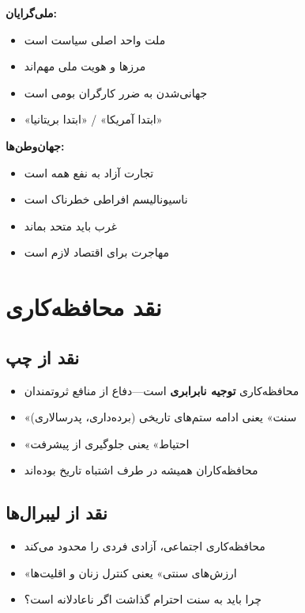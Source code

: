 \begin{debatebox}
\textbf{ملی‌گرایان:}
\begin{itemize}[nosep]
    \item ملت واحد اصلی سیاست است
    \item مرزها و هویت ملی مهم‌اند
    \item جهانی‌شدن به ضرر کارگران بومی است
    \item «ابتدا آمریکا» / «ابتدا بریتانیا»
\end{itemize}

\textbf{جهان‌وطن‌ها:}
\begin{itemize}[nosep]
    \item تجارت آزاد به نفع همه است
    \item ناسیونالیسم افراطی خطرناک است
    \item غرب باید متحد بماند
    \item مهاجرت برای اقتصاد لازم است
\end{itemize}
\end{debatebox}

\section{نقد محافظه‌کاری}

\subsection{نقد از چپ}

\begin{itemize}[nosep, rightmargin=1.5cm]
    \item محافظه‌کاری \textbf{توجیه نابرابری} است—دفاع از منافع ثروتمندان
    \item «سنت» یعنی ادامه ستم‌های تاریخی (برده‌داری، پدرسالاری)
    \item «احتیاط» یعنی جلوگیری از پیشرفت
    \item محافظه‌کاران همیشه در طرف اشتباه تاریخ بوده‌اند
\end{itemize}

\subsection{نقد از لیبرال‌ها}

\begin{itemize}[nosep, rightmargin=1.5cm]
    \item محافظه‌کاری اجتماعی، آزادی فردی را محدود می‌کند
    \item «ارزش‌های سنتی» یعنی کنترل زنان و اقلیت‌ها
    \item چرا باید به سنت احترام گذاشت اگر ناعادلانه است؟
\end{itemize}

